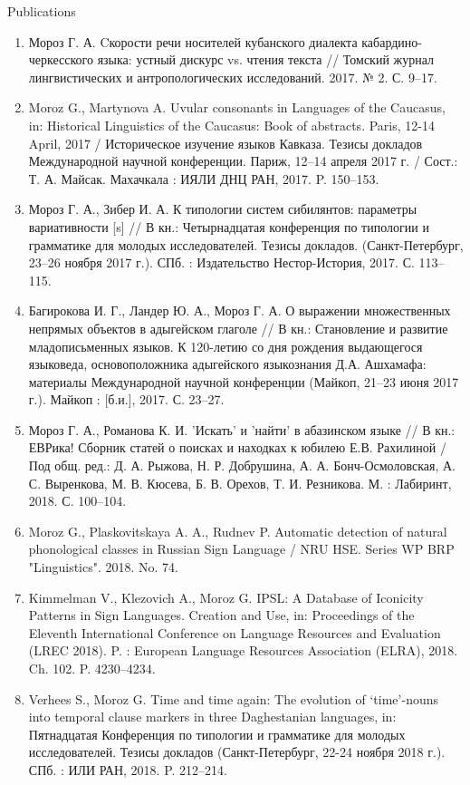 \documentclass{resume} %
\begin{document}
\begin{rSection}{Publications}
\begin{enumerate}
\item Мороз Г. А. Cкорости речи носителей кубанского диалекта кабардино-черкесского языка: устный дискурс vs. чтения текста // Томский журнал лингвистических и антропологических исследований. 2017. №  2. С. 9--17.
\item Moroz G., Martynova A. Uvular consonants in Languages of the Caucasus, in: Historical Linguistics of the Caucasus: Book of abstracts. Paris, 12-14 April, 2017 / Историческое изучение языков Кавказа. Тезисы докладов Международной научной конференции. Париж, 12--14 апреля 2017 г. / Сост.: Т. А. Майсак. Махачкала : ИЯЛИ ДНЦ РАН, 2017. P. 150--153.
\item Мороз Г. А., Зибер И. А. К типологии систем сибилянтов: параметры вариативности [s] // В кн.: Четырнадцатая конференция по типологии и грамматике для молодых исследователей. Тезисы докладов. (Санкт-Петербург, 23--26 ноября 2017 г.). СПб. : Издательство Нестор-История, 2017. С. 113--115.
\item Багирокова И. Г., Ландер Ю. А., Мороз Г. А. О выражении множественных непрямых объектов в адыгейском глаголе // В кн.: Становление и развитие младописьменных языков. К 120-летию со дня рождения выдающегося языковеда, основоположника адыгейского языкознания Д.А. Ашхамафа: материалы Международной научной конференции (Майкоп, 21--23 июня 2017 г.). Майкоп : [б.и.], 2017. С. 23--27.
\item  Мороз Г. А., Романова К. И. 'Искать' и 'найти' в абазинском языке // В кн.: ЕВРика! Сборник статей о поисках и находках к юбилею Е.В. Рахилиной / Под общ. ред.: Д. А. Рыжова, Н. Р. Добрушина, А. А. Бонч-Осмоловская, А. С. Выренкова, М. В. Кюсева, Б. В. Орехов, Т. И. Резникова. М. : Лабиринт, 2018. С. 100--104.
\item Moroz G., Plaskovitskaya A. A., Rudnev P. Automatic detection of natural phonological classes in Russian Sign Language / NRU HSE. Series WP BRP "Linguistics". 2018. No. 74.
\item Kimmelman V., Klezovich A., Moroz G. IPSL: A Database of Iconicity Patterns in Sign Languages. Creation and Use, in: Proceedings of the Eleventh International Conference on Language Resources and Evaluation (LREC 2018). P. : European Language Resources Association (ELRA), 2018. Ch. 102. P. 4230--4234.
\item Verhees S., Moroz G. Time and time again: The evolution of ‘time’-nouns into temporal clause markers in three Daghestanian languages, in: Пятнадцатая Конференция по типологии и грамматике для молодых исследователей. Тезисы докладов (Санкт-Петербург, 22-24 ноября 2018 г.). СПб. : ИЛИ РАН, 2018. P. 212--214.

\end{enumerate}
\end{rSection}
\end{document}
